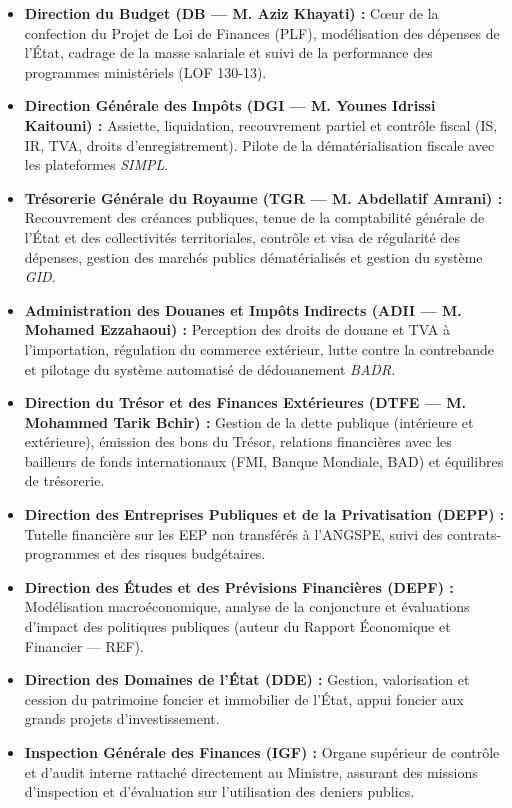 \begin{tcolorbox}[colback=gray!5!white,colframe=gray!75!black,title=\textbf{Les Directions Opérationnelles et Stratégiques du MEF}]
\begin{itemize}
    \item \textbf{Direction du Budget (DB --- M. Aziz Khayati) :} Cœur de la confection du Projet de Loi de Finances (PLF), modélisation des dépenses de l'État, cadrage de la masse salariale et suivi de la performance des programmes ministériels (LOF 130-13).
    \item \textbf{Direction Générale des Impôts (DGI --- M. Younes Idrissi Kaitouni) :} Assiette, liquidation, recouvrement partiel et contrôle fiscal (IS, IR, TVA, droits d'enregistrement). Pilote de la dématérialisation fiscale avec les plateformes \textit{SIMPL}.
    \item \textbf{Trésorerie Générale du Royaume (TGR --- M. Abdellatif Amrani) :} Recouvrement des créances publiques, tenue de la comptabilité générale de l'État et des collectivités territoriales, contrôle et visa de régularité des dépenses, gestion des marchés publics dématérialisés et gestion du système \textit{GID}.
    \item \textbf{Administration des Douanes et Impôts Indirects (ADII --- M. Mohamed Ezzahaoui) :} Perception des droits de douane et TVA à l'importation, régulation du commerce extérieur, lutte contre la contrebande et pilotage du système automatisé de dédouanement \textit{BADR}.
    \item \textbf{Direction du Trésor et des Finances Extérieures (DTFE --- M. Mohammed Tarik Bchir) :} Gestion de la dette publique (intérieure et extérieure), émission des bons du Trésor, relations financières avec les bailleurs de fonds internationaux (FMI, Banque Mondiale, BAD) et équilibres de trésorerie.
    \item \textbf{Direction des Entreprises Publiques et de la Privatisation (DEPP) :} Tutelle financière sur les EEP non transférés à l'ANGSPE, suivi des contrats-programmes et des risques budgétaires.
    \item \textbf{Direction des Études et des Prévisions Financières (DEPF) :} Modélisation macroéconomique, analyse de la conjoncture et évaluations d'impact des politiques publiques (auteur du Rapport Économique et Financier --- REF).
    \item \textbf{Direction des Domaines de l'État (DDE) :} Gestion, valorisation et cession du patrimoine foncier et immobilier de l'État, appui foncier aux grands projets d'investissement.
    \item \textbf{Inspection Générale des Finances (IGF) :} Organe supérieur de contrôle et d'audit interne rattaché directement au Ministre, assurant des missions d'inspection et d'évaluation sur l'utilisation des deniers publics.
\end{itemize}
\end{tcolorbox}

